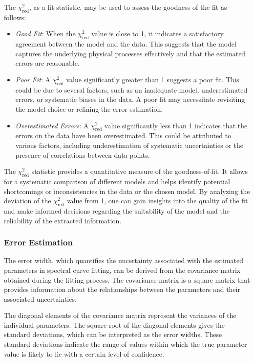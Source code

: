 				The $\chi^2_\text{red}$, as a fit statistic, may be used to assess the goodness of the fit as follows:
				\begin{itemize}
					\item \textit{Good Fit}: When the $\chi^2_\text{red}$ value is close to 1, it indicates a satisfactory agreement between the model and the data. This suggests that the model captures the underlying physical processes effectively and that the estimated errors are reasonable.
					\item \textit{Poor Fit}: A $\chi^2_\text{red}$ value significantly greater than 1 suggests a poor fit. This could be due to several factors, such as an inadequate model, underestimated errors, or systematic biases in the data. A poor fit may necessitate revisiting the model choice or refining the error estimation.
					\item \textit{Overestimated Errors}: A $\chi^2_\text{red}$ value significantly less than 1 indicates that the errors on the data have been overestimated. This could be attributed to various factors, including underestimation of systematic uncertainties or the presence of correlations between data points.
				\end{itemize}
				
				The $\chi^2_\text{red}$ statistic provides a quantitative measure of the goodness-of-fit. It allows for a systematic comparison of different models and helps identify potential shortcomings or inconsistencies in the data or the chosen model. By analyzing the deviation of the $\chi^2_\text{red}$ value from 1, one can gain insights into the quality of the fit and make informed decisions regarding the suitability of the model and the reliability of the extracted information.
			
			\subsubsection{Error Estimation}
				The error width, which quantifies the uncertainty associated with the estimated parameters in spectral curve fitting, can be derived from the covariance matrix obtained during the fitting process. The covariance matrix is a square matrix that provides information about the relationships between the parameters and their associated uncertainties.
				
				The diagonal elements of the covariance matrix represent the variances of the individual parameters. The square root of the diagonal elements gives the standard deviations, which can be interpreted as the error widths. These standard deviations indicate the range of values within which the true parameter value is likely to lie with a certain level of confidence.
				

